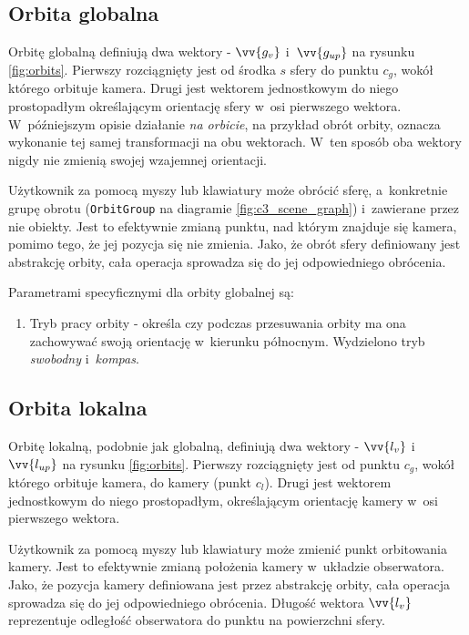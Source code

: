 \subsection{Orbita globalna}

Orbitę globalną definiują dwa wektory - $\vv{g_v}$ i~$\vv{g_{up}}$ na rysunku \ref{fig:orbits}. Pierwszy rozciągnięty jest od środka $s$ sfery do punktu $c_g$, wokół którego orbituje kamera. Drugi jest wektorem jednostkowym do niego prostopadłym określającym orientację sfery w~osi pierwszego wektora. W~późniejszym opisie działanie \textit{na orbicie}, na przykład obrót orbity, oznacza wykonanie tej samej transformacji na obu wektorach. W~ten sposób oba wektory nigdy nie zmienią swojej wzajemnej orientacji.

Użytkownik za pomocą myszy lub klawiatury może obrócić sferę, a~konkretnie grupę obrotu (\texttt{OrbitGroup} na diagramie \ref{fig:c3_scene_graph}) i~zawierane przez nie obiekty. Jest to efektywnie zmianą punktu, nad którym znajduje się kamera, pomimo tego, że jej pozycja się nie zmienia. Jako, że obrót sfery definiowany jest abstrakcję orbity, cała operacja sprowadza się do jej odpowiedniego obrócenia. 
\begin{samepage}
Parametrami specyficznymi dla orbity globalnej są:
\begin{enumerate}
    \item Tryb pracy orbity - określa czy podczas przesuwania orbity ma ona zachowywać swoją orientację w~kierunku północnym. Wydzielono tryb \textit{swobodny} i~\textit{kompas}.
\end{enumerate}
\end{samepage}
\subsection{Orbita lokalna}

Orbitę lokalną, podobnie jak globalną, definiują dwa wektory - $\vv{l_v}$ i~$\vv{l_{up}}$ na rysunku \ref{fig:orbits}. Pierwszy rozciągnięty jest od punktu $c_g$, wokół którego orbituje kamera, do kamery (punkt $c_l$). Drugi jest wektorem jednostkowym do niego prostopadłym, określającym orientację kamery w~osi pierwszego wektora.

Użytkownik za pomocą myszy lub klawiatury może zmienić punkt orbitowania kamery. Jest to efektywnie zmianą położenia kamery w~układzie obserwatora. Jako, że pozycja kamery definiowana jest przez abstrakcję orbity, cała operacja sprowadza się do jej odpowiedniego obrócenia. Długość wektora $\vv{l_v}$ reprezentuje odległość obserwatora do punktu na powierzchni sfery. 

